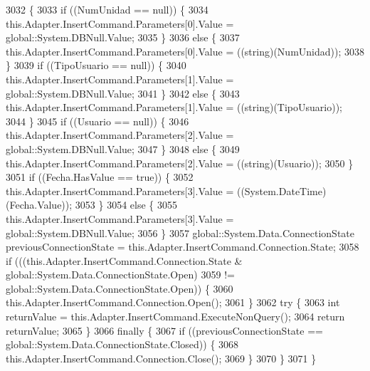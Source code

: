 \begin{DoxyCode}
3032                                                                                                            
                                       \{
3033             \textcolor{keywordflow}{if} ((NumUnidad == null)) \{
3034                 this.Adapter.InsertCommand.Parameters[0].Value = global::System.DBNull.Value;
3035             \}
3036             \textcolor{keywordflow}{else} \{
3037                 this.Adapter.InsertCommand.Parameters[0].Value = ((string)(NumUnidad));
3038             \}
3039             \textcolor{keywordflow}{if} ((TipoUsuario == null)) \{
3040                 this.Adapter.InsertCommand.Parameters[1].Value = global::System.DBNull.Value;
3041             \}
3042             \textcolor{keywordflow}{else} \{
3043                 this.Adapter.InsertCommand.Parameters[1].Value = ((string)(TipoUsuario));
3044             \}
3045             \textcolor{keywordflow}{if} ((Usuario == null)) \{
3046                 this.Adapter.InsertCommand.Parameters[2].Value = global::System.DBNull.Value;
3047             \}
3048             \textcolor{keywordflow}{else} \{
3049                 this.Adapter.InsertCommand.Parameters[2].Value = ((string)(Usuario));
3050             \}
3051             \textcolor{keywordflow}{if} ((Fecha.HasValue == \textcolor{keyword}{true})) \{
3052                 this.Adapter.InsertCommand.Parameters[3].Value = ((System.DateTime)(Fecha.Value));
3053             \}
3054             \textcolor{keywordflow}{else} \{
3055                 this.Adapter.InsertCommand.Parameters[3].Value = global::System.DBNull.Value;
3056             \}
3057             global::System.Data.ConnectionState previousConnectionState = 
      this.Adapter.InsertCommand.Connection.State;
3058             \textcolor{keywordflow}{if} (((this.Adapter.InsertCommand.Connection.State & global::System.Data.ConnectionState.Open) 
3059                         != global::System.Data.ConnectionState.Open)) \{
3060                 this.Adapter.InsertCommand.Connection.Open();
3061             \}
3062             \textcolor{keywordflow}{try} \{
3063                 \textcolor{keywordtype}{int} returnValue = this.Adapter.InsertCommand.ExecuteNonQuery();
3064                 \textcolor{keywordflow}{return} returnValue;
3065             \}
3066             \textcolor{keywordflow}{finally} \{
3067                 \textcolor{keywordflow}{if} ((previousConnectionState == global::System.Data.ConnectionState.Closed)) \{
3068                     this.Adapter.InsertCommand.Connection.Close();
3069                 \}
3070             \}
3071         \}
\end{DoxyCode}
